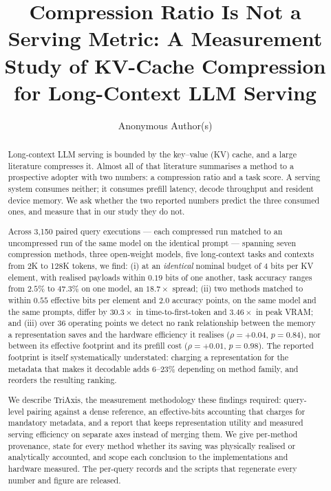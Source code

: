 \documentclass[sigplan,10pt,anonymous,review,nonacm]{acmart}
\newcommand{\sys}{TriAxis}
\begin{document}
\title[Compression Ratio Is Not a Serving Metric]{%
       Compression Ratio Is Not a Serving Metric: A Measurement Study of
       KV-Cache Compression for Long-Context LLM Serving}

\author{Anonymous Author(s)}

\begin{abstract}
Long-context LLM serving is bounded by the key--value (KV) cache, and a large
literature compresses it. Almost all of that literature summarises a method to
a prospective adopter with two numbers: a compression ratio and a task score.
A serving system consumes neither; it consumes prefill latency, decode
throughput and resident device memory. We ask whether the two reported numbers
predict the three consumed ones, and measure that in our study they do not.

Across 3{,}150 paired query executions --- each compressed run matched to an
uncompressed run of the same model on the identical prompt --- spanning seven
compression methods, three open-weight models, five long-context tasks and
contexts from 2K to 128K tokens, we find: (i) at an \emph{identical} nominal
budget of 4 bits per KV element, with realised payloads within $0.19$ bits of
one another, task accuracy ranges from $2.5\%$ to $47.3\%$ on one model, an
$18.7\times$ spread; (ii) two methods matched to within $0.55$ effective bits
per element and $2.0$ accuracy points, on the same model and the same prompts,
differ by $30.3\times$ in time-to-first-token and $3.46\times$ in peak VRAM;
and (iii) over 36 operating points we detect no rank relationship between the
memory a representation saves and the hardware efficiency it realises
($\rho = {+}0.04$, $p = 0.84$), nor between its effective footprint and its
prefill cost ($\rho = {+}0.01$, $p = 0.98$). The reported footprint is itself
systematically understated: charging a representation for the metadata that
makes it decodable adds $6$--$23\%$ depending on method family, and reorders
the resulting ranking.

We describe \sys{}, the measurement methodology these findings required:
query-level pairing against a dense reference, an effective-bits accounting
that charges for mandatory metadata, and a report that keeps representation
utility and measured serving efficiency on separate axes instead of merging
them. We give per-method provenance, state for every method whether its
saving was physically realised or analytically accounted, and scope each
conclusion to the implementations and hardware measured. The per-query records
and the scripts that regenerate every number and figure are released.
\end{abstract}
\end{document}
